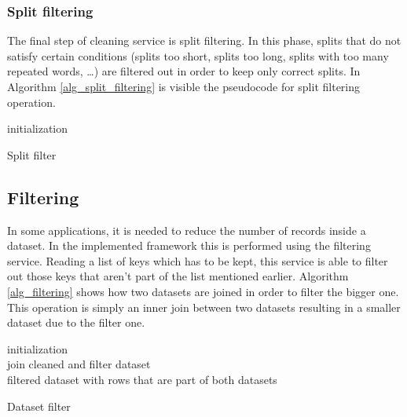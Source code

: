 \documentclass[\main/main.tex]{subfiles}
\begin{document}
\subsubsection{Split filtering}
The final step of cleaning service is split filtering. In this phase, splits that do not satisfy certain conditions (splits too short, splits too long, splits with too many repeated words, \dots) are filtered out in order to keep only correct splits. In Algorithm \ref{alg_split_filtering} is visible the pseudocode for split filtering operation. 
\begin{center}
    \begin{algorithm}[H]
     initialization \\
     \caption{Split filter}
     \label{alg_split_filtering}
    \end{algorithm}
\end{center}

\subsection{Filtering}
In some applications, it is needed to reduce the number of records inside a dataset. In the implemented framework this is performed using the filtering service. Reading a list of keys which has to be kept, this service is able to filter out those keys that aren't part of the list mentioned earlier. Algorithm \ref{alg_filtering} shows how two datasets are joined in order to filter the bigger one. This operation is simply an inner join between two datasets resulting in a smaller dataset due to the filter one.
\begin{center}
    \begin{algorithm}[H]
     initialization \\
     join cleaned and filter dataset \\
     \Return filtered dataset with rows that are part of both datasets
     \caption{Dataset filter}
     \label{alg_filtering}
    \end{algorithm}
\end{center}
\end{document}

